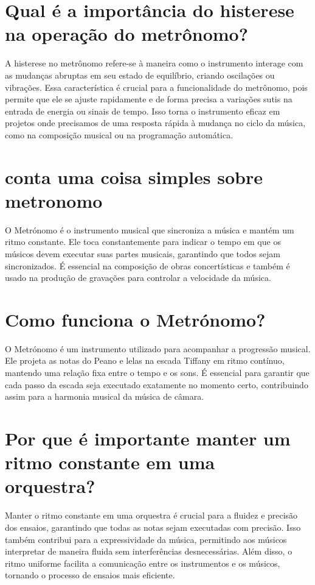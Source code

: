 \documentclass[11pt,a4paper]{article}
\begin{document}
\section{Qual é a importância do histerese na operação do metrônomo?}
A histerese no metrônomo refere-se à maneira como o instrumento interage com as mudanças abruptas em seu estado de equilíbrio, criando oscilações ou vibrações. Essa característica é crucial para a funcionalidade do metrônomo, pois permite que ele se ajuste rapidamente e de forma precisa a variações sutis na entrada de energia ou sinais de tempo. Isso torna o instrumento eficaz em projetos onde precisamos de uma resposta rápida à mudança no ciclo da música, como na composição musical ou na programação automática.

\section{conta uma coisa simples sobre metronomo}
O Metrónomo é o instrumento musical que sincroniza a música e mantém um ritmo constante. Ele toca constantemente para indicar o tempo em que os músicos devem executar suas partes musicais, garantindo que todos sejam sincronizados. É essencial na composição de obras concertísticas e também é usado na produção de gravações para controlar a velocidade da música.

\section{Como funciona o Metrónomo?}
O Metrónomo é um instrumento utilizado para acompanhar a progressão musical. Ele projeta as notas do Peano e lelas na escada Tiffany em ritmo contínuo, mantendo uma relação fixa entre o tempo e os sons. É essencial para garantir que cada passo da escada seja executado exatamente no momento certo, contribuindo assim para a harmonia musical da música de câmara.

\section{Por que é importante manter um ritmo constante em uma orquestra?}
Manter o ritmo constante em uma orquestra é crucial para a fluidez e precisão dos ensaios, garantindo que todas as notas sejam executadas com precisão. Isso também contribui para a expressividade da música, permitindo aos músicos interpretar de maneira fluida sem interferências desnecessárias. Além disso, o ritmo uniforme facilita a comunicação entre os instrumentos e os músicos, tornando o processo de ensaios mais eficiente.
\end{document}

